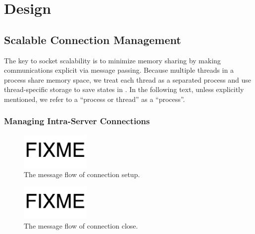 \section{Design}
\label{sec:intra-server}

\subsection{Scalable Connection Management}
\label{subsec:socket-api}

The key to socket scalability is to minimize memory sharing by making communications explicit via message passing. Because multiple threads in a process share memory space, we treat each thread as a separated process and use thread-specific storage to save states in \libipc. In the following text, unless explicitly mentioned, we refer to a ``process or thread'' as a ``process''.


\subsubsection{Managing Intra-Server Connections}
\label{subsubsec:connection_management}

\begin{figure}[t]
	\centering
	\includegraphics[width=0.3\textwidth]{images/fixme}
	\caption{The message flow of connection setup.}
	\label{fig:conn-setup}
\end{figure}

\begin{figure}[t]
	\centering
	\includegraphics[width=0.3\textwidth]{images/fixme}
	\caption{The message flow of connection close.}
	\label{fig:conn-close}
\end{figure}

